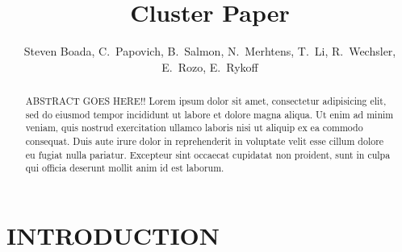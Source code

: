 \documentclass[apj, revtex4]{emulateapj}
\begin{document}
\title{Cluster Paper}

\author{\sc Steven Boada, 
C.~Papovich,
B.~Salmon, 
N.~Merhtens,
T.~Li, 
R.~Wechsler,
E.~Rozo,
E.~Rykoff} 


\begin{abstract}
\noindent
ABSTRACT GOES HERE!!
Lorem ipsum dolor sit amet, consectetur adipisicing elit, sed do eiusmod tempor incididunt ut labore et dolore magna aliqua. Ut enim ad minim veniam, quis nostrud exercitation ullamco laboris nisi ut aliquip ex ea commodo consequat. Duis aute irure dolor in reprehenderit in voluptate velit esse cillum dolore eu fugiat nulla pariatur. Excepteur sint occaecat cupidatat non proident, sunt in culpa qui officia deserunt mollit anim id est laborum.
\end{abstract}

\section{INTRODUCTION}
\end{document}
